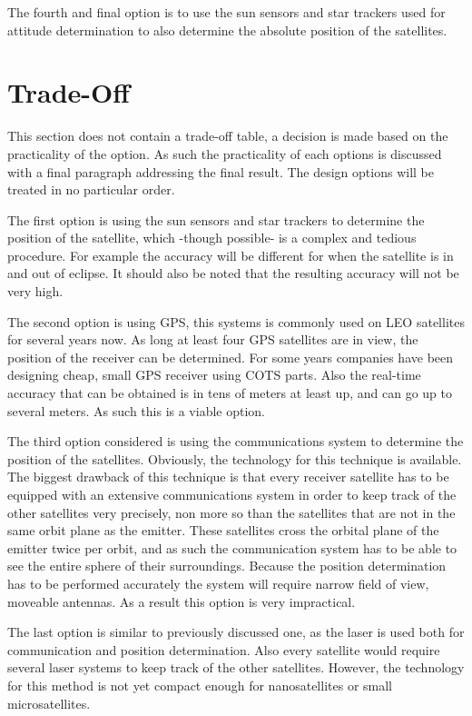 \documentclass[11pt]{report}
\begin{document}
The fourth and final option is to use the sun sensors and star trackers used for attitude determination to also determine the absolute position of the satellites.

\section{Trade-Off}
\label{navi2}
This section does not contain a trade-off table, a decision is made based on the practicality of the option. As such the practicality of each options is discussed with a final paragraph addressing the final result. The design options will be treated in no particular order.

The first option is using the sun sensors and star trackers to determine the position of the satellite, which -though possible- is a complex and tedious procedure. For example the accuracy will be different for when the satellite is in and out of eclipse. It should also be noted that the resulting accuracy will not be very high.

The second option is using \acs{GPS}, this systems is commonly used on \acs{LEO} satellites for several years now. As long at least four \acs{GPS} satellites are in view, the position of the receiver can be determined. For some years companies have been designing cheap, small GPS receiver using \acs{COTS} parts. Also the real-time accuracy that can be obtained is in tens of meters at least up, and can go up to several meters. As such this is a viable option.

The third option considered is using the communications system to determine the position of the satellites. Obviously, the technology for this technique is available. The biggest drawback of this technique is that every receiver satellite has to be equipped with an extensive communications system in order to keep track of the other satellites very precisely, non more so than the satellites that are not in the same orbit plane as the emitter. These satellites cross the orbital plane of the emitter twice per orbit, and as such the communication system has to be able to see the entire sphere of their surroundings. Because the position determination has to be performed accurately the system will require narrow field of view, moveable antennas. As a result this option is very impractical.

The last option is similar to previously discussed one, as the laser is used both for communication and position determination. Also every satellite would require several laser systems to keep track of the other satellites. However, the technology for this method is not yet compact enough for nanosatellites or small microsatellites.
\end{document}
